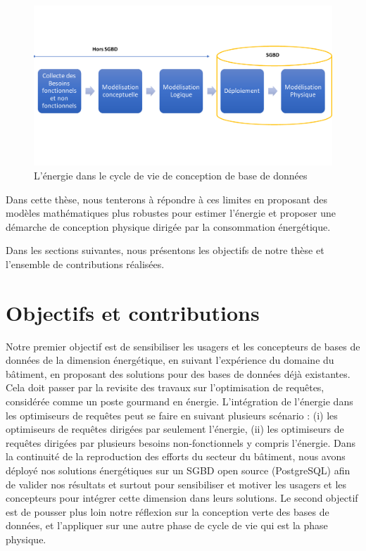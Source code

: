 \begin{figure}
	\begin{center}
		\includegraphics[scale=0.5]{chapitre1/chap1Fig/cyclehors.pdf}
		\caption{L'énergie dans le cycle de vie de conception de base de données}
		\label{fig:cyclehors}
	\end{center}
\end{figure}

Dans cette thèse, nous tenterons à répondre à ces limites en proposant des modèles mathématiques plus robustes pour estimer l'énergie et proposer une démarche de conception physique dirigée par la consommation énergétique. 

Dans les sections suivantes, nous présentons les objectifs de notre thèse et l'ensemble de contributions réalisées.

\section{Objectifs et contributions}
Notre premier objectif est de sensibiliser les usagers et les concepteurs de bases de données de la dimension énergétique, en suivant l'expérience du domaine du bâtiment, en proposant des solutions pour des bases de données déjà existantes. Cela doit passer par la revisite des travaux sur l'optimisation de requêtes, considérée comme un poste gourmand en énergie. L'intégration de l'énergie dans les optimiseurs de requêtes peut se faire en suivant plusieurs scénario : (i) les optimiseurs de requêtes dirigées par seulement l'énergie, (ii) les optimiseurs de requêtes dirigées par plusieurs besoins non-fonctionnels y compris l'énergie. Dans la continuité de la reproduction des efforts du secteur du bâtiment, nous avons déployé nos solutions énergétiques sur un SGBD open source (PostgreSQL) afin de valider nos résultats et surtout pour sensibiliser et motiver les usagers et les concepteurs pour intégrer cette dimension dans leurs solutions. 
Le second objectif est de pousser plus loin notre réflexion sur la conception verte des bases de données, et l'appliquer sur une autre phase de cycle de vie qui est la phase physique. 

